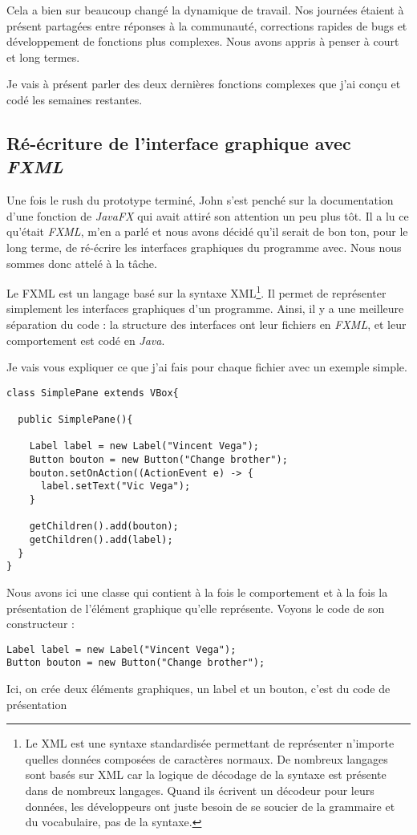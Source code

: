 Cela a bien sur beaucoup changé la dynamique de travail. Nos journées étaient à présent partagées entre réponses à la communauté, corrections rapides de bugs et développement de fonctions plus complexes. Nous avons appris à penser à court et long termes.

Je vais à présent parler des deux dernières fonctions complexes que j'ai conçu et codé les semaines restantes.

%
%
\subsection{Ré-écriture de l'interface graphique avec \textit{FXML}}
Une fois le rush du prototype terminé, John s'est penché sur la documentation d'une fonction de \textit{JavaFX} qui avait attiré son attention un peu plus tôt. Il a lu ce qu'était \textit{FXML}, m'en a parlé et nous avons décidé qu'il serait de bon ton, pour le long terme, de ré-écrire les interfaces graphiques du programme avec. Nous nous sommes donc attelé à la tâche.

Le FXML est un langage basé sur la syntaxe XML\footnote{Le XML est une syntaxe standardisée permettant de représenter n'importe quelles données composées de caractères normaux. De nombreux langages sont basés sur XML car la logique de décodage de la syntaxe est présente dans de nombreux langages. Quand ils écrivent un décodeur pour leurs données, les développeurs ont juste besoin de se soucier de la grammaire et du vocabulaire, pas de la syntaxe.}. Il permet de représenter simplement les interfaces graphiques d'un programme. Ainsi, il y a une meilleure séparation du code : la structure des interfaces ont leur fichiers en \textit{FXML}, et leur comportement est codé en \textit{Java}.

Je vais vous expliquer ce que j'ai fais pour chaque fichier avec un exemple simple.
\begin{verbatim}
class SimplePane extends VBox{

  public SimplePane(){
    
    Label label = new Label("Vincent Vega");
    Button bouton = new Button("Change brother");
    bouton.setOnAction((ActionEvent e) -> {
      label.setText("Vic Vega");
    }

    getChildren().add(bouton);
    getChildren().add(label);
  }
}
\end{verbatim}

Nous avons ici une classe qui contient à la fois le comportement et à la fois la présentation de l'élément graphique qu'elle représente. Voyons le code de son constructeur :
\begin{verbatim}
Label label = new Label("Vincent Vega");
Button bouton = new Button("Change brother");
\end{verbatim}
Ici, on crée deux éléments graphiques, un label et un bouton, c'est du code de présentation

